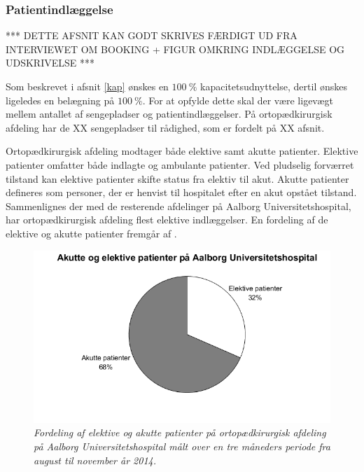 \subsubsection{Patientindlæggelse}
*** DETTE AFSNIT KAN GODT SKRIVES FÆRDIGT UD FRA INTERVIEWET OM BOOKING + FIGUR OMKRING INDLÆGGELSE OG UDSKRIVELSE ***


Som beskrevet i afsnit \ref{kap} ønskes en $100~\%$ kapacitetsudnyttelse, dertil ønskes ligeledes en belægning på $100~\%$. 
For at opfylde dette skal der være ligevægt mellem antallet af sengepladser og patientindlæggelser. På ortopædkirurgisk afdeling har de XX sengepladser til rådighed, som er fordelt på XX afsnit.

Ortopædkirurgisk afdeling modtager både elektive samt akutte patienter. Elektive patienter omfatter både indlagte og ambulante patienter. Ved pludselig forværret tilstand kan elektive patienter skifte status fra elektiv til akut. Akutte patienter defineres som personer, der er henvist til hospitalet efter en akut opstået tilstand. Sammenlignes der med de resterende afdelinger på Aalborg Universitetshospital, har ortopædkirurgisk afdeling flest elektive indlæggelser.\cite{RegionNord2016} En fordeling af de elektive og akutte patienter fremgår af .

\begin{figure}[H]
	\flushleft 
	\centering
	\includegraphics[scale=0.8]{figures/elektivvsakut.png}
	\flushleft
	\caption{\textit{Fordeling af elektive og akutte patienter på ortopædkirurgisk afdeling på Aalborg Universitetshospital målt over en tre måneders periode fra august til november år 2014.}}
	\label{elektivvsakut}
	\end{figure}

